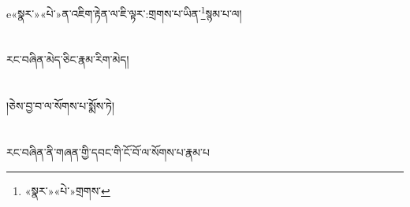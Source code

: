 e{«སྣར་»«པེ་»ན་}འཇིག་རྟེན་ལ་ཇི་ལྟར་:གྲགས་པ་ཡིན་\footnote{«སྣར་»«པེ་»གྲགས་}སྙམ་པ་ལ།\chapter{ }རང་བཞིན་མེད་ཅིང་རྣམ་རིག་མེད།\chapter{ }།ཅེས་བྱ་བ་ལ་སོགས་པ་སྨོས་ཏེ།\chapter{ }རང་བཞིན་ནི་གཞན་གྱི་དབང་གི་ངོ་བོ་ལ་སོགས་པ་རྣམ་པ